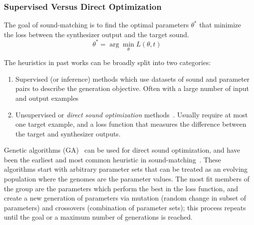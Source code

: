 \documentclass[lettersize,journal]{IEEEtran}
\providecommand{\gls}[1]{#1}
\begin{document}
\subsubsection{Supervised Versus Direct Optimization}
\label{sec:optimization}

The goal of sound-matching is to find the optimal parameters $\theta^*$ that minimize the loss between the synthesizer output and the target sound. 
\[
\theta^* = \arg\min_{\theta} L(\theta,t)
\]


The heuristics in past works can be broadly split into two categories:
\begin{enumerate}
    \item Supervised (or inference) methods which use datasets of sound and parameter pairs to describe the generation objective. Often with a large number of input and output examples~\cite{engel2020ddsp,salimi2020make,yee2018automatic,esling2019flow}
    \item Unsupervised or \textit{direct sound optimization} methods~\cite{horner1993machine,mitchell2007evolutionary,yee2018automatic,vahidi2023mesostructures}. Usually require at most one target example, and a loss function that measures the difference between the target and synthesizer outputs. 
\end{enumerate}

Genetic algorithms (\gls{GA})~\cite{holland1992genetic} can be used for direct sound optimization, and have been the earliest and most common heuristic in sound-matching~\cite{horner1993machine,mitchell2007evolutionary,yee2018automatic}. These algorithms start with arbitrary parameter sets that can be treated as an evolving population where the genomes are the parameter values. The most fit members of the group are the parameters which perform the best in the loss function, and create a new generation of parameters via mutation (random change in subset of parameters) and crossovers (combination of parameter sets); this process repeats until the goal or a maximum number of generations is reached. 

\end{document}

